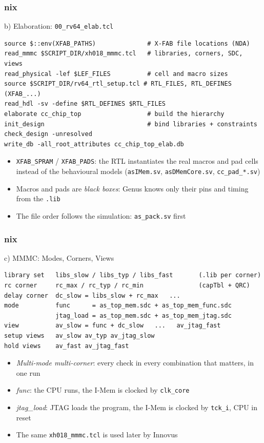 \documentclass{beamer}
\newcommand{\astitle}{nix}
\newcommand{\assubtitle}{nix}
\newcommand{\cmd}[1]{\texttt{#1}}
\begin{document}
\renewcommand{\assubtitle}{b) Elaboration: \texttt{00\_rv64\_elab.tcl}}
\begin{frame}[fragile]
\frametitle{\astitle}
\begin{block}{\assubtitle}
\begin{lstlisting}[style=sh]
source $::env(XFAB_PATHS)              # X-FAB file locations (NDA)
read_mmmc $SCRIPT_DIR/xh018_mmmc.tcl   # libraries, corners, SDC, views
read_physical -lef $LEF_FILES          # cell and macro sizes
source $SCRIPT_DIR/rv64_rtl_setup.tcl # RTL_FILES, RTL_DEFINES (XFAB_...)
read_hdl -sv -define $RTL_DEFINES $RTL_FILES
elaborate cc_chip_top                  # build the hierarchy
init_design                            # bind libraries + constraints
check_design -unresolved
write_db -all_root_attributes cc_chip_top_elab.db
\end{lstlisting}
  \begin{itemize}
    \item \cmd{XFAB\_SPRAM} / \cmd{XFAB\_PADS}: the RTL instantiates the
      real macros and pad cells instead of the behavioural models
      (\cmd{asIMem.sv}, \cmd{asDMemCore.sv}, \cmd{cc\_pad\_*.sv})
    \item Macros and pads are \emph{black boxes}: Genus knows only their
      pins and timing from the \cmd{.lib}
    \item The file order follows the simulation: \cmd{as\_pack.sv} first
  \end{itemize}
\end{block}
\end{frame}

\renewcommand{\assubtitle}{c) MMMC: Modes, Corners, Views}
\begin{frame}[fragile]
\frametitle{\astitle}
\begin{block}{\assubtitle}
\begin{lstlisting}
library set   libs_slow / libs_typ / libs_fast       (.lib per corner)
rc corner     rc_max / rc_typ / rc_min               (capTbl + QRC)
delay corner  dc_slow = libs_slow + rc_max   ...
mode          func      = as_top_mem.sdc + as_top_mem_func.sdc
              jtag_load = as_top_mem.sdc + as_top_mem_jtag.sdc
view          av_slow = func + dc_slow   ...   av_jtag_fast
setup views   av_slow av_typ av_jtag_slow
hold views    av_fast av_jtag_fast
\end{lstlisting}
  \begin{itemize}
    \item \emph{Multi-mode multi-corner}: every check in every combination
      that matters, in one run
    \item \emph{func}: the CPU runs, the I-Mem is clocked by \cmd{clk\_core}
    \item \emph{jtag\_load}: JTAG loads the program, the I-Mem is clocked by
      \cmd{tck\_i}, CPU in reset
    \item The same \cmd{xh018\_mmmc.tcl} is used later by Innovus
  \end{itemize}
\end{block}
\end{frame}
\end{document}
